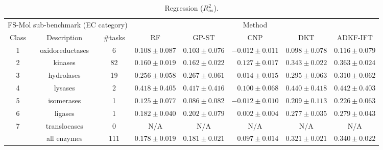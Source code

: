 \begin{table}[ht]
            \begin{subtable}{1.0\linewidth}
                \caption{Regression ($R_{os}^2$).}
                \centering
                \begin{tabular}{cccccccc}
                \toprule
                \multicolumn{3}{c}{FS-Mol sub-benchmark (EC category)} & \multicolumn{5}{c}{Method} \\
                \cmidrule(lr){1-3}\cmidrule(lr){4-8}
                Class & Description & \#tasks & RF & GP-ST & CNP & DKT & ADKF-IFT \\
                \midrule
                1 & oxidoreductases & 6 & $0.108\pm 0.087$ & $0.103\pm 0.076$ & $-0.012\pm 0.011$ & $0.098\pm 0.078$ & $\mathbf{0.116\pm 0.079}$ \\
                2 & kinases & 82 & $0.160\pm 0.019$ & $0.162\pm 0.022$ & $\:\:\,\,0.127\pm 0.017$ & $0.343\pm 0.022$ & $\mathbf{0.363\pm 0.024}$ \\
                3 & hydrolases & 19 & $0.256\pm 0.058$ & $0.267\pm 0.061$ & $\:\:\,\,0.014\pm 0.015$ & $0.295\pm 0.063$ & $\mathbf{0.310\pm 0.062}$ \\
                4 & lysases & 2 & $0.418\pm 0.405$ & $0.417\pm 0.416$ & $\:\:\,\,0.100\pm 0.068$ & $0.440\pm 0.418$ & $\mathbf{0.442\pm 0.403}$ \\
                5 & isomerases & 1 & $0.125\pm 0.077$ & $0.086\pm 0.082$ & $-0.012\pm 0.010$ & $0.209\pm 0.113$ & $\mathbf{0.226\pm 0.063}$ \\
                6 & ligases & 1 & $0.182\pm 0.040$ & $0.202\pm 0.079$ & $\:\:\,\,0.002\pm 0.004$ & $0.277\pm 0.035$ & $\mathbf{0.279\pm 0.043}$ \\
                7 & translocases & 0 & N/A & N/A & N/A & N/A & N/A \\
                \midrule
                & all enzymes & 111 & $0.178\pm 0.019$ & $0.181\pm 0.021$ & $\:\:\,\,0.097\pm 0.014$ & $0.321\pm 0.021$ & $\mathbf{0.340\pm 0.022}$ \\
                \bottomrule
            \end{tabular}
            \end{subtable}
        \end{table}
        
        
    

